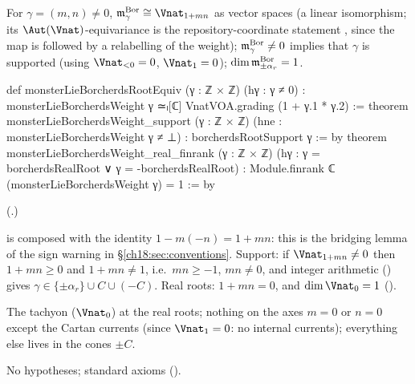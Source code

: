 \begin{theorem}\label{ch18:thm:borcherdsroot}
For $\gamma=(m,n)\neq0$, $\chXVIIIm^{\mathrm{Bor}}_\gamma\cong\Vnat_{1+mn}$ as vector spaces (a linear isomorphism; its $\Aut(\Vnat)$-equivariance is
the repository-coordinate statement , since the map is 
followed by a relabelling of the weight); $\mathfrak{m}^{\mathrm{Bor}}_\gamma\neq0$ implies that $\gamma$ is supported (using $\Vnat_{<0}=0$,
$\Vnat_1=0$); $\dim\mathfrak{m}^{\mathrm{Bor}}_{\pm\alpha_r}=1$.
\end{theorem}
\begin{leancode}
def monsterLieBorcherdsRootEquiv (γ : ℤ × ℤ) (hγ : γ ≠ 0) :
    monsterLieBorcherdsWeight γ ≃ₗ[ℂ] VnatVOA.grading (1 + γ.1 * γ.2) :=
theorem monsterLieBorcherdsWeight_support (γ : ℤ × ℤ) (hne : monsterLieBorcherdsWeight γ ≠ ⊥) :
    borcherdsRootSupport γ := by
theorem monsterLieBorcherdsWeight_real_finrank (γ : ℤ × ℤ)
    (hγ : γ = borcherdsRealRoot ∨ γ = -borcherdsRealRoot) :
    Module.finrank ℂ (monsterLieBorcherdsWeight γ) = 1 := by
\end{leancode}
(.)
\begin{dictionary}
 is  composed with the identity
$1-m(-n)=1+mn$: this is the bridging lemma of the sign warning in \S\ref{ch18:sec:conventions}.  Support: if
$\Vnat_{1+mn}\neq0$ then $1+mn\ge0$ and $1+mn\ne1$, i.e.\ $mn\ge-1$, $mn\ne0$, and integer arithmetic
() gives $\gamma\in\{\pm\alpha_r\}\cup C\cup(-C)$.  Real roots: $1+mn=0$, and $\dim\Vnat_0=1$
().
\end{dictionary}
\begin{physics}
The tachyon ($\Vnat_0$) at the real roots; nothing on the axes $m=0$ or $n=0$ except the Cartan currents (since
$\Vnat_1=0$: no internal currents); everything else lives in the cones $\pm C$.
\end{physics}
\begin{status}No hypotheses; standard axioms ().\end{status}

